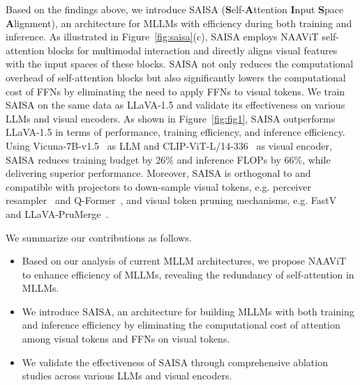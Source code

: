 Based on the findings above, we introduce SAISA (\textbf{S}elf-\textbf{A}ttention \textbf{I}nput \textbf{S}pace \textbf{A}lignment), an architecture for MLLMs with efficiency during both training and inference.
As illustrated in Figure~\ref{fig:saisa}(c), SAISA employs NAAViT self-attention blocks for multimodal interaction and directly aligns visual features with the input spaces of these blocks.
SAISA not only reduces the computational overhead of self-attention blocks but also significantly lowers the computational cost of FFNs by eliminating the need to apply FFNs to visual tokens.
We train SAISA on the same data as LLaVA-1.5 and validate its effectiveness on various LLMs and visual encoders.
As shown in Figure~\ref{fig:fig1}, SAISA outperforms LLaVA-1.5 in terms of performance, training efficiency, and inference efficiency.
Using Vicuna-7B-v1.5~\cite{vicuna} as LLM and CLIP-ViT-L/14-336~\cite{radford2021learningtransferablevisualmodels} as visual encoder, SAISA reduces training budget by 26\% and inference FLOPs by 66\%, while delivering superior performance.
Moreover, SAISA is orthogonal to and compatible with projectors to down-sample visual tokens, e.g. perceiver resampler~\cite{jaegle2021perceivergeneralperceptioniterative} and Q-Former~\cite{li2023blip2bootstrappinglanguageimagepretraining, dai2023instructblipgeneralpurposevisionlanguagemodels}, and visual token pruning mechanisms, e.g. FastV~\cite{chen2024imageworth12tokens} and LLaVA-PruMerge~\cite{shang2024llavaprumergeadaptivetokenreduction}.

We summarize our contributions as follows.
\begin{itemize}
    \item Based on our analysis of current MLLM architectures, we propose NAAViT to enhance efficiency of MLLMs, revealing the redundancy of self-attention in MLLMs.
    \item We introduce SAISA, an architecture for building MLLMs with both training and inference efficiency by eliminating the computational cost of attention among visual tokens and FFNs on visual tokens. 
    \item We validate the effectiveness of SAISA through comprehensive ablation studies across various LLMs and visual encoders.
\end{itemize}